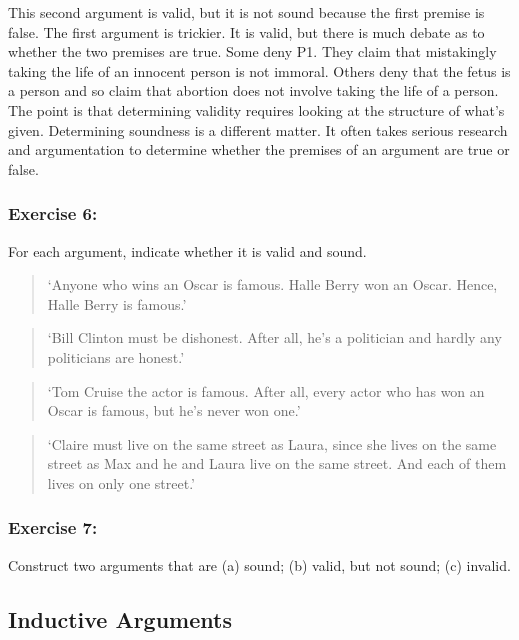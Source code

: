 \documentclass[]{article}
\begin{document}
This second argument is valid, but it is not sound because the first
premise is false. The first argument is trickier. It is valid, but there
is much debate as to whether the two premises are true. Some deny P1.
They claim that mistakingly taking the life of an innocent person is not
immoral. Others deny that the fetus is a person and so claim that
abortion does not involve taking the life of a person. The point is that
determining validity requires looking at the structure of what's given.
Determining soundness is a different matter. It often takes serious
research and argumentation to determine whether the premises of an
argument are true or false.

\subsubsection{Exercise 6:}\label{exercise-6}

For each argument, indicate whether it is valid and sound.

\begin{quote}
`Anyone who wins an Oscar is famous. Halle Berry won an Oscar. Hence,
Halle Berry is famous.'
\end{quote}

\begin{quote}
`Bill Clinton must be dishonest. After all, he's a politician and hardly
any politicians are honest.'
\end{quote}

\begin{quote}
`Tom Cruise the actor is famous. After all, every actor who has won an
Oscar is famous, but he's never won one.'
\end{quote}

\begin{quote}
`Claire must live on the same street as Laura, since she lives on the
same street as Max and he and Laura live on the same street. And each of
them lives on only one street.'
\end{quote}

\subsubsection{Exercise 7:}\label{exercise-7}

Construct two arguments that are (a) sound; (b) valid, but not sound;
(c) invalid.

\subsection{Inductive Arguments}\label{inductive-arguments}
\end{document}
